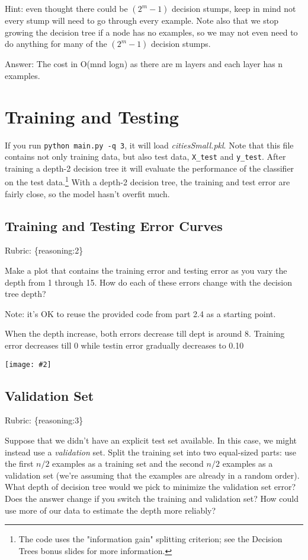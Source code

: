 \documentclass{article}
\def\blu#1{{\color{blu}#1}}
\def\gre#1{{\color{gre}#1}}
\newcommand{\fig}[2]{\texttt{[image: \#2]}}
\def\rubric#1{\gre{Rubric: \{#1\}}}{}
\begin{document}
Hint: even thought there could be $(2^m-1)$ decision stumps, keep in mind not every stump will need to go through every example. Note also that we stop growing the decision tree if a node has no examples, so we may not even need to do anything for many of the $(2^m-1)$ decision stumps.

Answer: The cost in O(mnd logn) as there are m layers and each layer has n examples.

\section{Training and Testing}
If you run \texttt{python main.py \string-q 3}, it will load \emph{citiesSmall.pkl}.
Note that this file contains not only training data, but also test data, \texttt{X\string_test} and \texttt{y\string_test}.
After training a depth-2 decision tree it will evaluate the performance of the classifier on the test data.\footnote{The code uses the "information gain" splitting criterion; see the Decision Trees bonus slides for more information.}
With a depth-2 decision tree, the training and test error are fairly close, so the model hasn't overfit much.

\subsection{Training and Testing Error Curves}
\rubric{reasoning:2}

\blu{Make a plot that contains the training error and testing error as you vary the depth from 1 through 15. How do each of these errors change with the decision tree depth?}

Note: it's OK to reuse the provided code from part 2.4 as a starting point.

When the depth increase, both errors decrease till dept is around 8. Training error decreases till 0 while testin error gradually decreases to 0.10

\fig{0.5}{../figs/q3_1_tree_errors}

\subsection{Validation Set}
\rubric{reasoning:3}

Suppose that we didn't have an explicit test set available. In this case, we might instead use a \emph{validation} set. Split the training set into two equal-sized parts: use the first $n/2$ examples as a training set and the second $n/2$ examples as a validation set (we're assuming that the examples are already in a random order). \blu{What depth of decision tree would we pick to minimize the validation set error? Does the answer change if you switch the training and validation set? How could use more of our data to  estimate the depth more reliably?}
\end{document}
